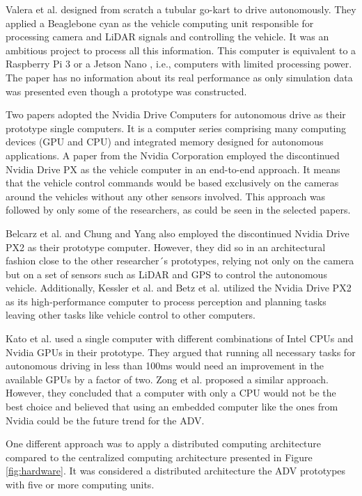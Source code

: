 \documentclass[lettersize,journal]{IEEEtran}
\begin{document}
Valera et al.  \cite{valera2019design} designed from scratch a tubular go-kart to drive autonomously. They applied a Beaglebone cyan \cite{BeagleBone} as the vehicle computing unit responsible for processing camera and LiDAR signals and controlling the vehicle. It was an ambitious project to process all this information. This computer is equivalent to a Raspberry Pi 3 \cite{RaspberryPI}  or a Jetson Nano \cite{JetsonNano}, i.e., computers with limited processing power. The paper has no information about its real performance as only simulation data was presented even though a prototype was constructed.

Two papers adopted the Nvidia Drive Computers for autonomous drive \cite{NvidiaDrive} as their prototype single computers. It is a computer series comprising many computing devices (GPU and CPU) and integrated memory designed for autonomous applications. A paper from the Nvidia Corporation \cite{Bojarski2016} employed the discontinued Nvidia Drive PX as the vehicle computer in an end-to-end approach. It means that the vehicle control commands would be based exclusively on the cameras around the vehicles without any other sensors involved. This approach was followed by only some of the researchers, as could be seen in the selected papers.

Belcarz et al. \cite{Belcarz2018} and Chung and Yang \cite{electronics10192447} also employed the discontinued Nvidia Drive PX2 as their prototype computer. However, they did so in an architectural fashion close to the other researcher´s prototypes, relying not only on the camera but on a set of sensors such as LiDAR and GPS to control the autonomous vehicle. Additionally, Kessler et al. \cite{Kessler2019} and Betz et al. \cite{Betz2019} utilized the Nvidia Drive PX2 as its high-performance computer to process perception and planning tasks leaving other tasks like vehicle control to other computers.

 Kato et al. \cite{Kato2015} used a single computer with different combinations of Intel CPUs and Nvidia GPUs in their prototype. They argued that running all necessary tasks for autonomous driving in less than 100ms would need an improvement in the available GPUs by a factor of two. Zong et al. \cite{Zong2018} proposed a similar approach. However, they concluded that a computer with only a CPU would not be the best choice and believed that using an embedded computer like the ones from Nvidia could be the future trend for the ADV.

One different approach was to apply a distributed computing architecture compared to the centralized computing architecture presented in Figure \ref{fig:hardware}. It was considered a distributed architecture the ADV prototypes with five or more computing units. 
\end{document}
